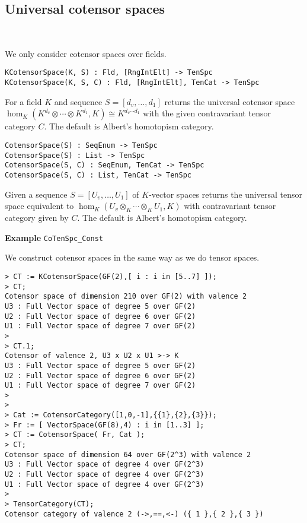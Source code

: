 \subsection{Universal cotensor spaces}~

We only consider cotensor spaces over fields.

\color{blue}
{\small \begin{verbatim}
KCotensorSpace(K, S) : Fld, [RngIntElt] -> TenSpc
KCotensorSpace(K, S, C) : Fld, [RngIntElt], TenCat -> TenSpc
\end{verbatim} }
\color{black}

For a field $K$ and sequence $S=[d_v,\dots, d_1]$ returns the universal cotensor 
space $\hom_K(K^{d_v}\otimes \cdots \otimes K^{d_1},K)\cong K^{d_v\cdots d_1}$ with the given contravariant tensor category $C$.
The default is Albert's homotopism category.

\color{blue}
{\small \begin{verbatim}
CotensorSpace(S) : SeqEnum -> TenSpc
CotensorSpace(S) : List -> TenSpc
CotensorSpace(S, C) : SeqEnum, TenCat -> TenSpc
CotensorSpace(S, C) : List, TenCat -> TenSpc
\end{verbatim} }
\color{black}

Given a sequence $S=[U_v,\dots, U_1]$ of $K$-vector spaces returns the universal tensor 
space equivalent to $\hom_K(U_v\otimes_K\cdots\otimes_K U_1,K)$ with contravariant tensor 
category given by $C$. The default is Albert's homotopism category.

\begin{framed}{\bf Example} {\tt CoTenSpc\_Const}\\
{\small We construct cotensor spaces in the same way as we do tensor spaces.
\begin{lstlisting}[frame=single,basicstyle=\ttfamily\color{black!30!
teal},backgroundcolor=\color{white!70!gray}]
> CT := KCotensorSpace(GF(2),[ i : i in [5..7] ]);
> CT;
Cotensor space of dimension 210 over GF(2) with valence 2
U3 : Full Vector space of degree 5 over GF(2)
U2 : Full Vector space of degree 6 over GF(2)
U1 : Full Vector space of degree 7 over GF(2)
> 
> CT.1;
Cotensor of valence 2, U3 x U2 x U1 >-> K
U3 : Full Vector space of degree 5 over GF(2)
U2 : Full Vector space of degree 6 over GF(2)
U1 : Full Vector space of degree 7 over GF(2)
> 
> 
> Cat := CotensorCategory([1,0,-1],{{1},{2},{3}});
> Fr := [ VectorSpace(GF(8),4) : i in [1..3] ];
> CT := CotensorSpace( Fr, Cat );
> CT;
Cotensor space of dimension 64 over GF(2^3) with valence 2
U3 : Full Vector space of degree 4 over GF(2^3)
U2 : Full Vector space of degree 4 over GF(2^3)
U1 : Full Vector space of degree 4 over GF(2^3)
> 
> TensorCategory(CT);
Cotensor category of valence 2 (->,==,<-) ({ 1 },{ 2 },{ 3 })
\end{lstlisting}
}
\end{framed}

